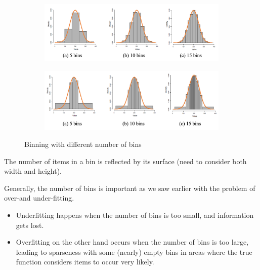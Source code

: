 \begin{figure}[h]
  \centering
  \begin{subfigure}{0.75\textwidth}
    \centering
    \includegraphics[width=\textwidth]{assets/visualization_and_extraction/prep/bin_equ_width.png}
  \end{subfigure}

  \vspace*{0.2cm}

  \begin{subfigure}{0.75\textwidth}
    \centering
    \includegraphics[width=\textwidth]{assets/visualization_and_extraction/prep/bin_equ_frequ.png}
  \end{subfigure}
  \caption{Binning with different number of bins}
  \label{fig:2_binning_approaches}
\end{figure}

The number of items in a bin is reflected by its surface (need to consider both width and height). 

Generally, the number of bins is important as we saw earlier with the problem of over-and under-fitting. 
\begin{itemize}
  \item Underfitting happens when the number of bins is too small, and information gets lost.
  \item Overfitting on the other hand occurs when the number of bins is too large, leading to sparseness with some (nearly) empty bins in areas where the true function considers items to occur very likely.
\end{itemize}

